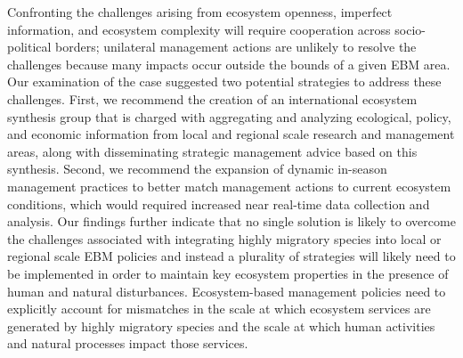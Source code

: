 Confronting the challenges arising from ecosystem openness, imperfect
information, and ecosystem complexity will require cooperation across
socio-political borders; unilateral management actions are unlikely to resolve
the challenges because many impacts occur outside the bounds of a given EBM
area. Our examination of the case suggested two potential strategies to address
these challenges. First, we recommend the creation of an international ecosystem
synthesis group that is charged with aggregating and analyzing ecological,
policy, and economic information from local and regional scale research and
management areas, along with disseminating strategic management advice based on
this synthesis. Second, we recommend the expansion of dynamic in-season
management practices to better match management actions to current ecosystem
conditions, which would required increased near real-time data collection and
analysis. Our findings further indicate that no single solution is likely to
overcome the challenges associated with integrating highly migratory species
into local or regional scale EBM policies and instead a plurality of strategies
will likely need to be implemented in order to maintain key ecosystem properties
in the presence of human and natural disturbances. Ecosystem-based management
policies need to explicitly account for mismatches in the scale at which
ecosystem services are generated by highly migratory species and the scale at
which human activities and natural processes impact those services.


